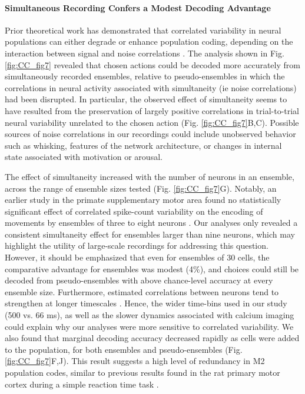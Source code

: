 \paragraph{Simultaneous Recording Confers a Modest Decoding Advantage}
Prior theoretical work has demonstrated that correlated variability in neural populations can either degrade or enhance population coding, depending on the interaction between signal and noise correlations \citep{averbeck2003neural, averbeck2006neural}. The analysis shown in Fig. \ref{fig:CC_fig7} revealed that chosen actions could be decoded more accurately from simultaneously recorded ensembles, relative to pseudo-ensembles in which the correlations in neural activity associated with simultaneity (ie noise correlations) had been disrupted. In particular, the observed effect of simultaneity seems to have resulted from the preservation of largely positive correlations in trial-to-trial neural variability unrelated to the chosen action (Fig. \ref{fig:CC_fig7}B,C). Possible sources of noise correlations in our recordings could include unobserved behavior such as whisking, features of the network architecture, or changes in internal state associated with motivation or arousal.

The effect of simultaneity increased with the number of neurons in an ensemble, across the range of ensemble sizes tested (Fig. \ref{fig:CC_fig7}G). Notably, an earlier study in the primate supplementary motor area found no statistically significant effect of correlated spike-count variability on the encoding of movements by ensembles of three to eight neurons \citep{averbeck2006effects}. Our analyses only revealed a consistent simultaneity effect for ensembles larger than nine neurons, which may highlight the utility of large-scale recordings for addressing this question. However, it should be emphasized that even for ensembles of 30 cells, the comparative advantage for ensembles was modest (4\%), and choices could still be decoded from pseudo-ensembles with above chance-level accuracy at every ensemble size. Furthermore, estimated correlations between neurons tend to strengthen at longer timescales \citep{averbeck2003neural}. Hence, the wider time-bins used in our study (500 vs. 66 ms), as well as the slower dynamics associated with calcium imaging could explain why our analyses were more sensitive to correlated variability. We also found that marginal decoding accuracy decreased rapidly as cells were added to the population, for both ensembles and pseudo-ensembles (Fig. \ref{fig:CC_fig7}F,J). This result suggests a high level of redundancy in M2 population codes, similar to previous results found in the rat primary motor cortex during a simple reaction time task \citep{narayanan2005redundancy}.

